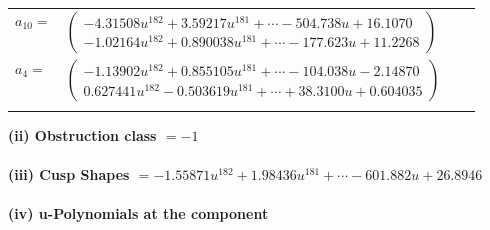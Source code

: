 \documentclass[1p]{elsarticle_modified}
\theoremstyle{definition}
\begin{document}
\begin{tabular}{m{7pt} m{180pt} m{7pt} m{180pt} }
\flushright $a_{10}=$&$\begin{pmatrix}-4.31508 u^{182}+3.59217 u^{181}+\cdots-504.738 u+16.1070\\-1.02164 u^{182}+0.890038 u^{181}+\cdots-177.623 u+11.2268\end{pmatrix}$ \\
\flushright $a_{4}=$&$\begin{pmatrix}-1.13902 u^{182}+0.855105 u^{181}+\cdots-104.038 u-2.14870\\0.627441 u^{182}-0.503619 u^{181}+\cdots+38.3100 u+0.604035\end{pmatrix}$\\&\end{tabular}
\flushleft \textbf{(ii) Obstruction class $= -1$}\\~\\
\flushleft \textbf{(iii) Cusp Shapes $= -1.55871 u^{182}+1.98436 u^{181}+\cdots-601.882 u+26.8946$}\\~\\
\newpage\renewcommand{\arraystretch}{1}
\flushleft \textbf{(iv) u-Polynomials at the component}\newline \\
\end{document}
